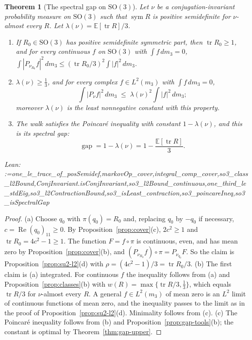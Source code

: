\documentclass[11pt]{amsart}
\makeatletter
\newtheorem{theorem}{Theorem}[section]
\theoremstyle{definition}
\theoremstyle{remark}
\newcommand{\@leanlist}[1]{\def\@leansep{}\@for\@leanname:=#1\do{\@leansep
  \texttt{\expandafter\detokenize\expandafter{\@leanname}}\def\@leansep{, }}}
\newcommand{\lean}[1]{\par\smallskip\noindent
  {\footnotesize\normalfont\raggedright\textsf{Lean:} \@leanlist{#1}\par}}
\newcommand{\E}{\mathbb{E}}
\newcommand{\SO}{\mathrm{SO}}
\newcommand{\tr}{\operatorname{tr}}
\newcommand{\sym}{\operatorname{sym}}
\newcommand{\re}{\operatorname{Re}}
\newcommand{\gap}{\operatorname{gap}}
\makeatother
\begin{document}
\begin{theorem}[The spectral gap on $\SO(3)$]\label{thm:so3-gap}
Let $\nu$ be a conjugation-invariant probability measure on $\SO(3)$ such that $\sym R$ is
positive semidefinite for $\nu$-almost every $R$.  Let $\lambda(\nu)=\E[\tr R]/3$.
\begin{enumerate}
\item[(a)] If $R_0\in\SO(3)$ has positive semidefinite symmetric part, then $\tr R_0\ge1$, and
for every continuous $f$ on $\SO(3)$ with $\int f\,dm_3=0$,
$\int|P_{\nu_{R_0}}f|^2\,dm_3\le(\tr R_0/3)^2\int|f|^2\,dm_3$.
\item[(b)] $\lambda(\nu)\ge\tfrac13$, and for every complex $f\in L^2(m_3)$ with
$\int f\,dm_3=0$,
\[
  \int|P_\nu f|^2\,dm_3\;\le\;\lambda(\nu)^2\int|f|^2\,dm_3 ;
\]
moreover $\lambda(\nu)$ is the least nonnegative constant with this property.
\item[(c)] The walk satisfies the Poincar\'e inequality with constant $1-\lambda(\nu)$, and
this is its spectral gap:
\[
  \gap=1-\lambda(\nu)=1-\frac{\E[\tr R]}{3}.
\]
\end{enumerate}
\lean{one_le_trace_of_posSemidef,markovOp_cover,integral_comp_cover,so3_class_l2Bound,ConjInvariant.isConjInvariant,so3_l2Bound_continuous,one_third_le_stdEig,so3_l2ContractionBound,so3_isLeast_contraction,so3_poincareIneq,so3_isSpectralGap}
\end{theorem}

\begin{proof}
(a) Choose $q_0$ with $\pi(q_0)=R_0$ and, replacing $q_0$ by $-q_0$ if necessary,
$c=\re(q_0)_{11}\ge0$.  By Proposition~\ref{prop:cover}(c), $2c^2\ge1$ and
$\tr R_0=4c^2-1\ge1$.  The function $F=f\circ\pi$ is continuous, even, and has mean zero by
Proposition~\ref{prop:cover}(b), and $(P_{\nu_{R_0}}f)\circ\pi=P_{\nu_{q_0}}F$.  So the claim is
Proposition~\ref{prop:su2-l2}(d) with $\rho=(4c^2-1)/3=\tr R_0/3$.  (b) The first claim is (a)
integrated.  For continuous $f$ the inequality follows from (a) and
Proposition~\ref{prop:classes}(b) with $w(R)=\max\{\tr R/3,\tfrac13\}$, which equals $\tr R/3$
for $\nu$-almost every $R$.  A general $f\in L^2(m_3)$ of mean zero is an $L^2$ limit of
continuous functions of mean zero, and the inequality passes to the limit as in the proof of
Proposition~\ref{prop:su2-l2}(d).  Minimality follows from (c).  (c) The Poincar\'e inequality
follows from (b) and Proposition~\ref{prop:gap-tools}(b); the constant is optimal by
Theorem~\ref{thm:gap-upper}.
\end{proof}
\end{document}
